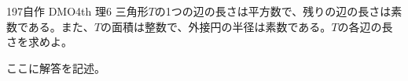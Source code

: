 \begin{thm}{197}{\maru}{自作 DMO4th 理6}
 三角形$T$の1つの辺の長さは平方数で、残りの辺の長さは素数である。また、$T$の面積は整数で、外接円の半径は素数である。$T$の各辺の長さを求めよ。
\end{thm}

ここに解答を記述。
